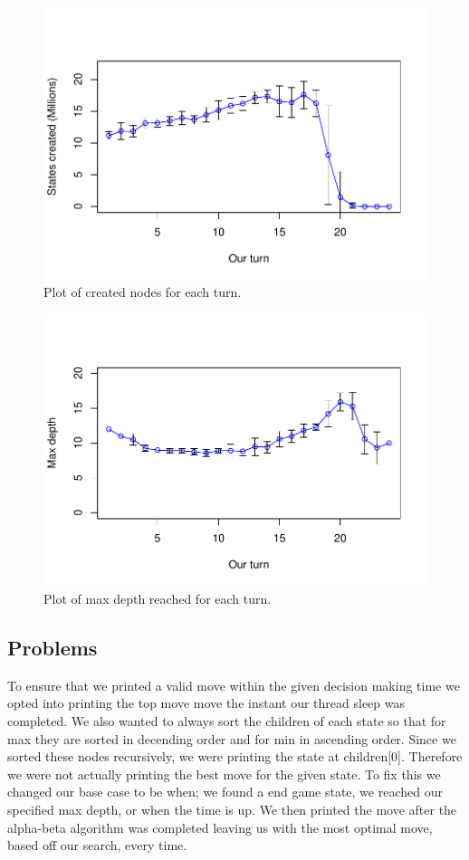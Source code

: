 \documentclass[12pt]{article}
\begin{document}
\begin{figure}
  \centering
  \includegraphics[scale=0.5]{../results/created_plot.pdf}
  \caption{Plot of created nodes for each turn.}
  \label{fig:create}
\end{figure}

\begin{figure}
  \centering
  \includegraphics[scale=0.5]{../results/depth_plot.pdf}
  \caption{Plot of max depth reached for each turn.}
  \label{fig:depth}
\end{figure}

\subsection*{Problems}
To ensure that we printed a valid move within the given decision making time we opted into printing the top move move the instant our thread sleep was completed.
We also wanted to always sort the children of each state so that for max they are sorted in decending order and for min in ascending order.
Since we sorted these nodes recursively, we were printing the state at children[0].
Therefore we were not actually printing the best move for the given state.
To fix this we changed our base case to be when; we found a end game state, we reached our specified max depth, or when the time is up.
We then printed the move after the alpha-beta algorithm was completed leaving us with the most optimal move, based off our search,  every time.
\end{document}
